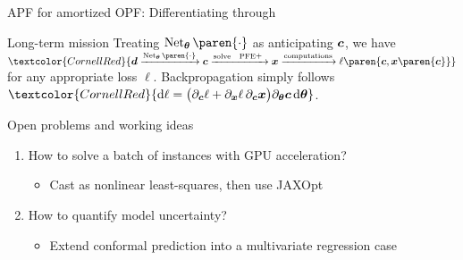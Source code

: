 \begin{frame}[t]{APF for amortized OPF: Differentiating through \APFE}{}
    \begin{exampleblock}{Long-term mission}
        Treating \(\operatorname{Net}_{\boldsymbol{\theta}}\paren{\cdot}\)
        as anticipating \(\boldsymbol{c}\),
        we have
        \(\textcolor{CornellRed}{\DemDrws
        \xrightarrow{\operatorname{Net}_{\boldsymbol{\theta}}\paren{\cdot}}
        \SupInjs \xrightarrow{\text{solve \APFE}} \PFEVars \xrightarrow{\text{computations}}
        \ell\paren{\SupInjs,\PFEVars\paren{\SupInjs}}}\)
        for any appropriate loss \(\ell\).
        Backpropagation simply follows
        \textcolor{CornellRed}{
        \(\textcolor{CornellRed}{\odif{\ell} =
        \bigl(\partial_{\SupInjs}\ell + \partial_{\PFEVars}\ell\, \partial_{\SupInjs}\PFEVars\bigr)
        \partial_{\boldsymbol{\theta}}\SupInjs \odif{\boldsymbol{\theta}}}\)}.
    \end{exampleblock}

    \begin{alertblock}{Open problems and working ideas}
        \begin{enumerate}
            \item How to solve a batch of \APFE instances with GPU acceleration?
            \begin{itemize}
                \item[\faLightbulb] Cast as nonlinear least-squares,
                    then use JAXOpt \cite{Blondel+2022v5}
            \end{itemize}

            \item How to quantify model uncertainty?
            \begin{itemize}
                \item[\faLightbulb] Extend conformal prediction \cite{GenIntroConfPred_v5}
                    into a multivariate regression case
            \end{itemize}
        \end{enumerate}
        \end{alertblock}
\end{frame}
